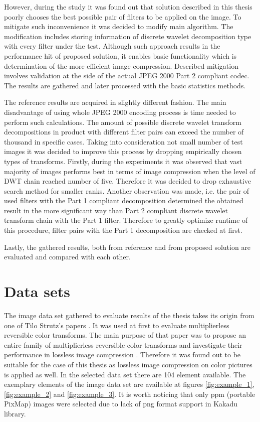 However, during the study it was found out that solution described in this thesis poorly chooses
the best possible pair of filters to be applied on the image. To mitigate such inconvenience it
was decided to modify main algorithm. The modification includes storing information of discrete
wavelet decomposition type with every filter under the test. Although such approach results in
the performance hit of proposed solution, it enables basic functionality which is determination
of the more efficient image compression. Described mitigation involves validation at the side of
the actual JPEG 2000 Part 2 compliant codec. The results are gathered and later processed with
the basic statistics methods.

The reference results are acquired in slightly different fashion. The main disadvantage of using
whole JPEG 2000 encoding process is time needed to perform such calculations. The amount of possible
discrete wavelet transform decompositions in product with different filter pairs can exceed the
number of thousand in specific cases. Taking into consideration not small number of test images
it was decided to improve this process by dropping empirically chosen types of transforms. Firstly,
during the experiments it was observed that vast majority of images performs best in terms of
image compression when the level of DWT chain reached number of five. Therefore it was decided to
drop exhaustive search method for smaller ranks. Another observation was made, i.e. the pair of used
filters with the Part 1 compliant decomposition determined the obtained result in the more significant
way than Part 2 compliant discrete wavelet transform chain with the Part 1 filter. Therefore
to greatly optimize runtime of this procedure, filter pairs with the Part 1 decomposition are
checked at first.

Lastly, the gathered results, both from reference and from proposed solution are evaluated and
compared with each other. 

\section{Data sets}

The image data set gathered to evaluate results of the thesis takes its origin from one of
Tilo Strutz's papers \cite{ref_images}. It was used at first to evaluate multiplierless reversible
color transforms. The main purpose of that paper was to propose an entire family of multiplierless
reversible color transforms and investigate their performance in lossless image compression \cite{multiplierless_rct}.
Therefore it was found out to be suitable for the case of this thesis as lossless image compression
on color pictures is applied as well. In the selected data set there are 104 element available.
The exemplary elements of the image data set are available at
figures \ref{fig:example_1}, \ref{fig:example_2} and \ref{fig:example_3}. It is worth noticing that only ppm
(portable PixMap) images were selected due to lack of png format support in Kakadu library.

